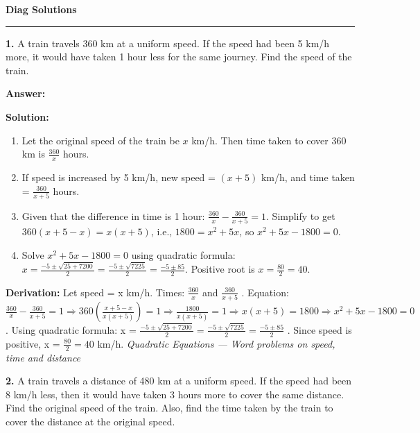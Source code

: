 \documentclass[12pt,a4paper]{exam}
\newcommand{\fitmath}[1]{%
  \sbox{\schmathbox}{$\displaystyle #1$}%
  \ifdim\wd\schmathbox>\linewidth
    \resizebox{\linewidth}{!}{\usebox{\schmathbox}}%
  \else
    \usebox{\schmathbox}%
  \fi}
\begin{document}
\thispagestyle{empty}
\begin{center}
  \textbf{\LARGE Diag Solutions} \\[0.3cm]
  \rule{\textwidth}{0.5pt}
\end{center}

\vspace{0.3cm}

\begin{questions}
\question \textbf{1.} A train travels 360 km at a uniform speed. If the speed had been 5 km/h more, it would have taken 1 hour less for the same journey. Find the speed of the train.

\textbf{Answer:}
\begin{center}
\fitmath{40 km/h}
\end{center}

\textbf{Solution:}
\begin{enumerate}
  \item Let the original speed of the train be $x$ km/h. Then time taken to cover 360 km is $\frac{360}{x}$ hours.
  \item If speed is increased by 5 km/h, new speed = $(x+5)$ km/h, and time taken = $\frac{360}{x+5}$ hours.
  \item Given that the difference in time is 1 hour: $\frac{360}{x} - \frac{360}{x+5} = 1$. Simplify to get $360(x+5 - x) = x(x+5)$, i.e., $1800 = x^2 + 5x$, so $x^2 + 5x - 1800 = 0$.
  \item Solve $x^2+5x-1800=0$ using quadratic formula: $x = \frac{-5 \pm \sqrt{25+7200}}{2} = \frac{-5 \pm \sqrt{7225}}{2} = \frac{-5 \pm 85}{2}$. Positive root is $x = \frac{80}{2} = 40$.
\end{enumerate}
\textbf{Derivation:}
Let speed =  x  km/h. Times:  $\frac{360}{x}$  and  $\frac{360}{x+5}$ . Equation:  $\frac{360}{x} - \frac{360}{x+5} = 1 \Rightarrow 360\left(\frac{x+5-x}{x(x+5)}\right)=1 \Rightarrow \frac{1800}{x(x+5)} = 1 \Rightarrow x(x+5)=1800 \Rightarrow x^2+5x-1800=0$ . Using quadratic formula:  x = $\frac{-5 \pm \sqrt{25+7200}}{2} = \frac{-5 \pm \sqrt{7225}}{2} = \frac{-5 \pm 85}{2}$ . Since speed is positive,  x = $\frac{80}{2}=40$  km/h.
\hfill \textit{Quadratic Equations — Word problems on speed, time and distance}
\vspace{0.3cm}

\question \textbf{2.} A train travels a distance of 480 km at a uniform speed. If the speed had been 8 km/h less, then it would have taken 3 hours more to cover the same distance. Find the original speed of the train. Also, find the time taken by the train to cover the distance at the original speed.


\end{questions}
\end{document}
